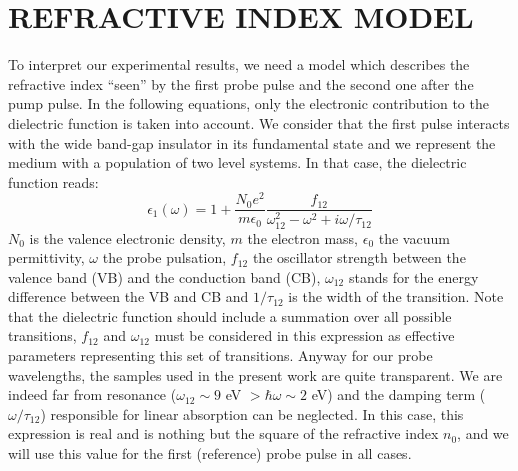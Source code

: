 \documentclass[aps,prb,reprint]{revtex4-2}
\begin{document}
\section{REFRACTIVE INDEX MODEL}

To interpret our experimental results, we need a model which describes the refractive index ``seen'' by the first probe pulse and the second one after the pump pulse. In the following equations, only the electronic contribution to the dielectric function is taken into account. We consider that the first pulse interacts with the wide band-gap insulator in its fundamental state and we represent the medium with a population of two level systems. In that case, the dielectric function reads:
\begin{equation}
\epsilon_1(\omega) = 1 + \frac{N_0 e^2}{m \epsilon_0} \frac{f_{12}}{\omega_{12}^2 - \omega^2 + i\omega/\tau_{12}}
\end{equation}
 $N_0$ is the valence electronic density, $m$ the electron mass, $\epsilon_0$ the vacuum permittivity, $\omega$ the probe pulsation, $f_{12}$ the oscillator strength between the valence band (VB) and the conduction band (CB), $\omega_{12}$ stands for the energy difference between the VB and CB and $1/\tau_{12}$ is the width of the transition. Note that the dielectric function should include a summation over all possible transitions, $f_{12}$ and $\omega_{12}$ must be considered in this expression as effective parameters representing this set of transitions. Anyway for our probe wavelengths, the samples used in the present work are quite transparent. We are indeed far from resonance ($\omega_{12} \sim 9$ eV $> \hbar\omega \sim 2$ eV) and the damping term ($\omega/\tau_{12}$) responsible for linear absorption can be neglected. In this case, this expression is real and is nothing but the square of the refractive index $n_0$, and we will use this value for the first (reference) probe pulse in all cases.
\end{document}
